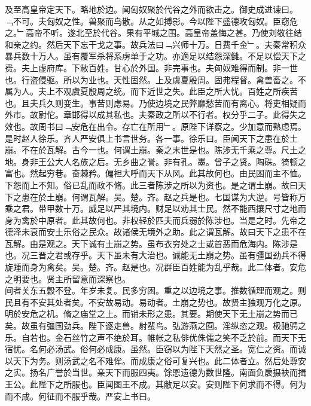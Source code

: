 \documentclass{zhvt-classic}
\begin{document}
\hspace*{2em}及至高皇帝定天下。略地於边。闻匈奴聚於代谷之外而欲击之。御史成进谏曰。﹁不可。夫匈奴之性。兽聚而鸟散。从之如搏影。今以陛下盛德攻匈奴。臣窃危之。﹂高帝不听。遂北至於代谷。果有平城之围。高皇帝盖悔之甚。乃使刘敬往结和亲之约。然后天下忘干戈之事。故兵法曰﹁兴师十万。日费千金﹂。夫秦常积众暴兵数十万人。虽有覆军杀将系虏单于之功。亦適足以结怨深雠。不足以偿天下之费。夫上虚府库。下敝百姓。甘心於外国。非完事也。夫匈奴难得而制。非一世也。行盗侵驱。所以为业也。天性固然。上及虞夏殷周。固弗程督。禽兽畜之。不属为人。夫上不观虞夏殷周之统。而下近世之失。此臣之所大忧。百姓之所疾苦也。且夫兵久则变生。事苦则虑易。乃使边境之民弊靡愁苦而有离心。将吏相疑而外市。故尉佗。章邯得以成其私也。夫秦政之所以不行者。权分乎二子。此得失之效也。故周书曰﹁安危在出令。存亡在所用﹂。原陛下详察之。少加意而熟虑焉。\\
\hspace*{2em}是时赵人徐乐。齐人严安俱上书言世务。各一事。徐乐曰。臣闻天下之患在於土崩。不在於瓦解。古今一也。何谓土崩。秦之末世是也。陈涉无千乘之尊。尺土之地。身非王公大人名族之后。无乡曲之誉。非有孔。墨。曾子之贤。陶硃。猗顿之富也。然起穷巷。奋棘矜。偏袒大呼而天下从风。此其故何也。由民困而主不恤。下怨而上不知。俗已乱而政不脩。此三者陈涉之所以为资也。是之谓土崩。故曰天下之患在於土崩。何谓瓦解。吴。楚。齐。赵之兵是也。七国谋为大逆。号皆称万乘之君。带甲数十万。威足以严其境内。财足以劝其士民。然不能西攘尺寸之地而身为禽於中原者。此其故何也。非权轻於匹夫而兵弱於陈涉也。当是之时。先帝之德泽未衰而安土乐俗之民众。故诸侯无境外之助。此之谓瓦解。故曰天下之患不在瓦解。由是观之。天下诚有土崩之势。虽布衣穷处之士或首恶而危海内。陈涉是也。况三晋之君或存乎。天下虽未有大治也。诚能无土崩之势。虽有彊国劲兵不得旋踵而身为禽矣。吴。楚。齐。赵是也。况群臣百姓能为乱乎哉。此二体者。安危之明要也。贤主所留意而深察也。\\
\hspace*{2em}间者关东五穀不登。年岁未复。民多穷困。重之以边境之事。推数循理而观之。则民且有不安其处者矣。不安故易动。易动者。土崩之势也。故贤主独观万化之原。明於安危之机。脩之庙堂之上。而销未形之患。其要。期使天下无土崩之势而已矣。故虽有彊国劲兵。陛下逐走兽。射蜚鸟。弘游燕之囿。淫纵恣之观。极驰骋之乐。自若也。金石丝竹之声不绝於耳。帷帐之私俳优侏儒之笑不乏於前。而天下无宿忧。名何必汤武。俗何必成康。虽然。臣窃以为陛下天然之圣。宽仁之资。而诚以天下为务。则汤武之名不难侔。而成康之俗可复兴也。此二体者立。然后处尊安之实。扬名广誉於当世。亲天下而服四夷。馀恩遗德为数世隆。南面负扆摄袂而揖王公。此陛下之所服也。臣闻图王不成。其敝足以安。安则陛下何求而不得。何为而不成。何征而不服乎哉。严安上书曰。\\
\end{document}
